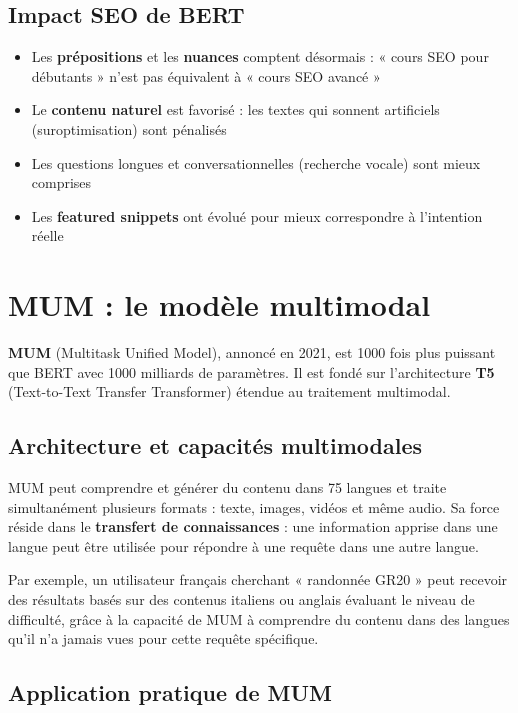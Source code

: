 \documentclass[12pt,a4paper,twoside]{report}
\newcommand{\keyword}[1]{\textbf{\textcolor{googleblue}{#1}}}
\newcommand{\important}[1]{\textbf{\textcolor{googlered}{#1}}}
\begin{document}
\subsection{Impact SEO de BERT}

\begin{itemize}
    \item Les \important{prépositions} et les \important{nuances} comptent désormais : « cours SEO pour débutants » n'est pas équivalent à « cours SEO avancé »
    \item Le \keyword{contenu naturel} est favorisé : les textes qui sonnent artificiels (suroptimisation) sont pénalisés
    \item Les questions longues et conversationnelles (recherche vocale) sont mieux comprises
    \item Les \keyword{featured snippets} ont évolué pour mieux correspondre à l'intention réelle
\end{itemize}

\section{MUM : le modèle multimodal}

\keyword{MUM} (Multitask Unified Model), annoncé en 2021, est 1000 fois plus puissant que BERT avec 1000 milliards de paramètres. Il est fondé sur l'architecture \keyword{T5} (Text-to-Text Transfer Transformer) étendue au traitement multimodal.

\subsection{Architecture et capacités multimodales}

MUM peut comprendre et générer du contenu dans 75 langues et traite simultanément plusieurs formats : texte, images, vidéos et même audio. Sa force réside dans le \keyword{transfert de connaissances} : une information apprise dans une langue peut être utilisée pour répondre à une requête dans une autre langue.

Par exemple, un utilisateur français cherchant « randonnée GR20 » peut recevoir des résultats basés sur des contenus italiens ou anglais évaluant le niveau de difficulté, grâce à la capacité de MUM à comprendre du contenu dans des langues qu'il n'a jamais vues pour cette requête spécifique.

\subsection{Application pratique de MUM}
\end{document}
